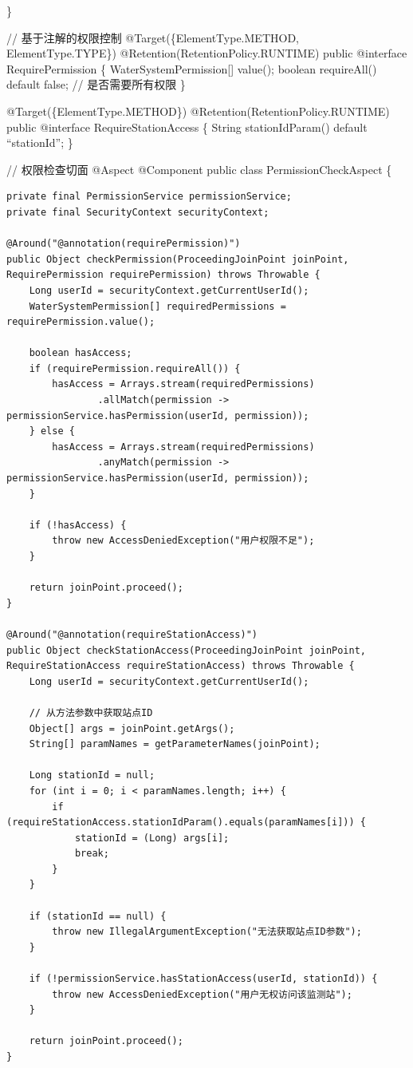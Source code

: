\}

// 基于注解的权限控制 @Target(\{ElementType.METHOD, ElementType.TYPE\}) @Retention(RetentionPolicy.RUNTIME) public @interface RequirePermission \{ WaterSystemPermission{[}{]} value(); boolean requireAll() default false; // 是否需要所有权限 \}

@Target(\{ElementType.METHOD\}) @Retention(RetentionPolicy.RUNTIME) public @interface RequireStationAccess \{ String stationIdParam() default ``stationId''; \}

// 权限检查切面 @Aspect @Component public class PermissionCheckAspect \{

\begin{verbatim}
private final PermissionService permissionService;
private final SecurityContext securityContext;

@Around("@annotation(requirePermission)")
public Object checkPermission(ProceedingJoinPoint joinPoint, RequirePermission requirePermission) throws Throwable {
    Long userId = securityContext.getCurrentUserId();
    WaterSystemPermission[] requiredPermissions = requirePermission.value();
    
    boolean hasAccess;
    if (requirePermission.requireAll()) {
        hasAccess = Arrays.stream(requiredPermissions)
                .allMatch(permission -> permissionService.hasPermission(userId, permission));
    } else {
        hasAccess = Arrays.stream(requiredPermissions)
                .anyMatch(permission -> permissionService.hasPermission(userId, permission));
    }
    
    if (!hasAccess) {
        throw new AccessDeniedException("用户权限不足");
    }
    
    return joinPoint.proceed();
}

@Around("@annotation(requireStationAccess)")
public Object checkStationAccess(ProceedingJoinPoint joinPoint, RequireStationAccess requireStationAccess) throws Throwable {
    Long userId = securityContext.getCurrentUserId();
    
    // 从方法参数中获取站点ID
    Object[] args = joinPoint.getArgs();
    String[] paramNames = getParameterNames(joinPoint);
    
    Long stationId = null;
    for (int i = 0; i < paramNames.length; i++) {
        if (requireStationAccess.stationIdParam().equals(paramNames[i])) {
            stationId = (Long) args[i];
            break;
        }
    }
    
    if (stationId == null) {
        throw new IllegalArgumentException("无法获取站点ID参数");
    }
    
    if (!permissionService.hasStationAccess(userId, stationId)) {
        throw new AccessDeniedException("用户无权访问该监测站");
    }
    
    return joinPoint.proceed();
}
\end{verbatim}

